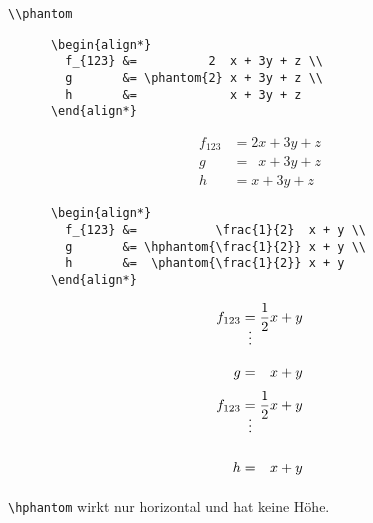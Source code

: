 \begin{frame}[fragile]{\lstinline+\\phantom+}
  \begin{CodeExample}{0.60}
    \begin{lstlisting}
      \begin{align*}
        f_{123} &=          2  x + 3y + z \\
        g       &= \phantom{2} x + 3y + z \\
        h       &=             x + 3y + z
      \end{align*}
    \end{lstlisting}
  \CodeResult
    \begin{align*}
      f_{123} &=          2  x + 3y + z \\
      g       &= \phantom{2} x + 3y + z \\
      h       &=             x + 3y + z
    \end{align*}
  \end{CodeExample}
  \begin{CodeExample}{0.70}
    \begin{lstlisting}
      \begin{align*}
        f_{123} &=           \frac{1}{2}  x + y \\
        g       &= \hphantom{\frac{1}{2}} x + y \\
        h       &=  \phantom{\frac{1}{2}} x + y
      \end{align*}
    \end{lstlisting}
  \CodeResult
    \begin{align*}
      f_{123} &=           \frac{1}{2}  x + y \\
              &\shortvdotswithin{=} \\
      g       &= \hphantom{\frac{1}{2}} x + y
    \end{align*}
    \begin{align*}
      f_{123} &=           \frac{1}{2}  x + y \\
              &\shortvdotswithin{=} \\
      h       &=  \phantom{\frac{1}{2}} x + y
    \end{align*}
  \end{CodeExample}
  \vspace{-1.5em}
  \lstinline+\hphantom+ wirkt nur horizontal und hat keine Höhe.
\end{frame}

